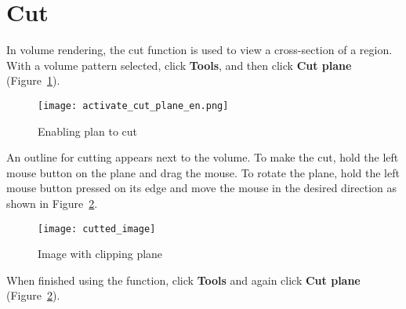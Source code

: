\newpage

\section{Cut}

In volume rendering, the cut function is used to view a cross-section of a region. With a volume pattern selected, click \textbf{Tools}, and then click \textbf{Cut plane} (Figure~\ref{fig:activate_cut_plane}).

\begin{figure}[!htb]
\centering
\texttt{[image: activate\_cut\_plane\_en.png]}
\caption{Enabling plan to cut}
\label{fig:activate_cut_plane}
\end{figure}

An outline for cutting appears next to the volume. To make the cut, hold the left mouse button on the plane and drag the mouse. To rotate the plane, hold the left mouse button pressed on its edge and move the mouse in the desired direction as shown in Figure~\ref{fig:cutted_image}.

\begin{figure}[!htb]
\centering
\texttt{[image: cutted\_image]}
\caption{Image with clipping plane}
\label{fig:cutted_image}
\end{figure}

When finished using the function, click \textbf{Tools} and again click \textbf{Cut plane} (Figure~\ref{fig:cutted_image}).